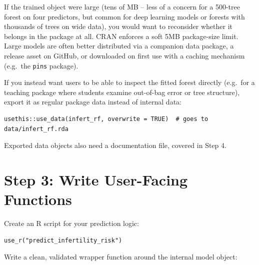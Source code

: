\documentclass[11pt]{article}
\begin{document}
If the trained object were large (tens of MB -- less of a concern for a 500-tree forest on four predictors, but common for deep learning models or forests with thousands of trees on wide data), you would want to reconsider whether it belongs in the package at all. CRAN enforces a soft 5MB package-size limit. Large models are often better distributed via a companion data package, a release asset on GitHub, or downloaded on first use with a caching mechanism (e.g.\ the \texttt{pins} package).

If you instead want users to be able to inspect the fitted forest directly (e.g.\ for a teaching package where students examine out-of-bag error or tree structure), export it as regular package data instead of internal data:

\begin{lstlisting}
usethis::use_data(infert_rf, overwrite = TRUE)  # goes to data/infert_rf.rda
\end{lstlisting}

Exported data objects also need a documentation file, covered in Step 4.

\section{Step 3: Write User-Facing Functions}

Create an R script for your prediction logic:

\begin{lstlisting}
use_r("predict_infertility_risk")
\end{lstlisting}

Write a clean, validated wrapper function around the internal model object:
\end{document}
